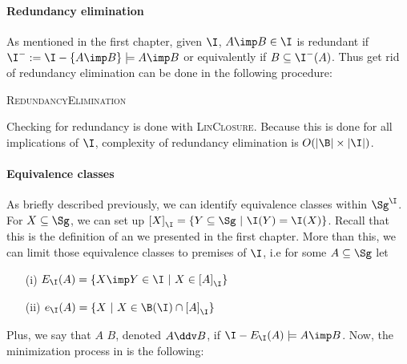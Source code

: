 \paragraph{Redundancy elimination} As mentioned in the first chapter, given 
$\I$, $A \imp B \in \I$ is redundant if $\I^{-} := \I - \{ A \imp B \} \models A \imp B$ or equivalently if $B \subseteq \I^{-}(A)$. Thus get rid of 
redundancy elimination can be done in the following procedure:

\begin{algorithm}
	
	\BlankLine
	\BlankLine
	
	
	\caption{\textsc{RedundancyElimination}}
	\label{alg:Maier-RE}	
\end{algorithm}

\noindent Checking for redundancy is done with \textsc{LinClosure}. Because this
is done for all implications of $\I$, complexity of redundancy elimination is
$O(|\B| \times |\I|)$.

\vspace{1.2em}

\paragraph{Equivalence classes} As briefly described previously, we can identify
equivalence classes within $\Sg^{\I}$. For $X \subseteq \Sg$, we can set up
$\left[ X \right]_{\I} = \{ Y \subseteq \Sg \ | \ \I(Y) = \I(X) \}$. Recall 
that this is the definition of an  we presented in the first chapter. More than this, we can limit those equivalence classes to premises of $\I$, i.e for some $A \subseteq \Sg$ let
\begin{itemize}
	\item[(i)] $E_{\I}(A) = \{ X \imp Y \in \I \ | \ X \in \left[ A 
	\right]_{\I} \}$ 
	\item[(ii)] $e_{\I}(A) =\{ X \ | \ X \in \B(\I) \cap \left[ A \right]_{\I} 
	\}$
\end{itemize}
\noindent Plus, we say that $A$  $B$, denoted $A 
\ddv B$, if $\I - E_{\I}(A) \models A \imp B$. Now, the minimization process
in \cite{maier_theory_1983, david_minimum_1980} is the following: 

